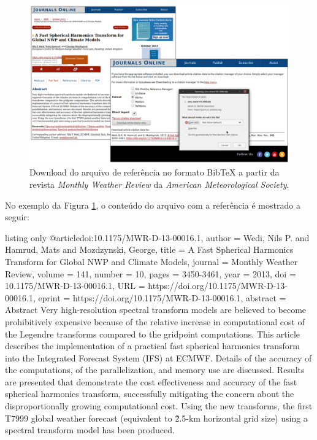 \begin{figure}[H]
\caption{Download do arquivo de referência no formato Bib\TeX{} a partir da revista \textit{Monthly Weather Review} da \textit{American Meteorological Society}.}
\vspace{6mm}
    \begin{center}
        \includegraphics[scale=0.4]{./docs/figs/exemplo_revista_ams_citacao.pdf}
    \end{center}
\vspace{4mm}
\label{fig:exemplo_revista_ams_citacao}
\end{figure}

No exemplo da Figura \ref{fig:exemplo_revista_ams_citacao}, o conteúdo do arquivo com a referência é mostrado a seguir:

\begin{texexp}{listing only}
@article{doi:10.1175/MWR-D-13-00016.1,
author   = {Wedi, Nils P. and Hamrud, Mats and Mozdzynski, George},
title    = {A Fast Spherical Harmonics Transform for Global NWP
            and Climate Models},
journal  = {Monthly Weather Review},
volume   = {141},
number   = {10},
pages    = {3450-3461},
year     = {2013},
doi      = {10.1175/MWR-D-13-00016.1},
URL      = {https://doi.org/10.1175/MWR-D-13-00016.1},
eprint   = {https://doi.org/10.1175/MWR-D-13-00016.1},
abstract = {Abstract Very high-resolution spectral transform models are believed to become prohibitively expensive because of the relative increase in computational cost of the Legendre transforms compared to the gridpoint computations. This article describes the implementation of a practical fast spherical harmonics transform into the Integrated Forecast System (IFS) at ECMWF. Details of the accuracy of the computations, of the parallelization, and memory use are discussed. Results are presented that demonstrate the cost effectiveness and accuracy of the fast spherical harmonics transform, successfully mitigating the concern about the disproportionally growing computational cost. Using the new transforms, the first T7999 global weather forecast (equivalent to \~2.5-km horizontal grid size) using a spectral transform model has been produced.}
}
\end{texexp}

